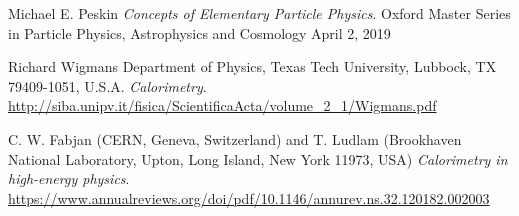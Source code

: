 
\cleardoublepage
{}
\begin{thebibliography}{99}

Michael E. Peskin
\textit{Concepts of Elementary Particle Physics}.
Oxford Master Series in Particle Physics, Astrophysics and Cosmology
April 2, 2019

Richard Wigmans
Department of Physics, Texas Tech University, Lubbock, TX 79409-1051, U.S.A.
\textit{Calorimetry}.
\url{http://siba.unipv.it/fisica/ScientificaActa/volume_2_1/Wigmans.pdf}

C. W. Fabjan (CERN, Geneva, Switzerland) and T. Ludlam (Brookhaven National Laboratory, Upton, Long Island, New York 11973, USA)
\textit{Calorimetry in high-energy physics}.
\url{https://www.annualreviews.org/doi/pdf/10.1146/annurev.ns.32.120182.002003}

\end{thebibliography}
